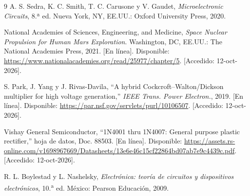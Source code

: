 \documentclass[conference,10pt]{IEEEtran}
\begin{document}
\begin{thebibliography}{9}
A. S. Sedra, K. C. Smith, T. C. Carusone y V. Gaudet, \emph{Microelectronic
Circuits}, 8.ª ed. Nueva York, NY, EE.UU.: Oxford University Press, 2020.

National Academies of Sciences, Engineering, and Medicine, \emph{Space
Nuclear Propulsion for Human Mars Exploration}. Washington, DC, EE.UU.:
The National Academies Press, 2021. [En línea]. Disponible:
\url{https://www.nationalacademies.org/read/25977/chapter/5}.
[Accedido: 12-oct-2026].

S. Park, J. Yang y J. Rivas-Davila, ``A hybrid Cockcroft--Walton/Dickson
multiplier for high voltage generation,'' \emph{IEEE Trans. Power
Electron.}, 2019. [En línea]. Disponible:
\url{https://par.nsf.gov/servlets/purl/10106507}.
[Accedido: 12-oct-2026].

Vishay General Semiconductor, ``1N4001 thru 1N4007: General purpose
plastic rectifier,'' hoja de datos, Doc. 88503. [En línea]. Disponible:
\url{https://assets.rs-online.com/v1698967669/Datasheets/13e6e46c15cf22864bd07ab7e9c4439c.pdf}.
[Accedido: 12-oct-2026].

R. L. Boylestad y L. Nashelsky, \emph{Electrónica: teoría de circuitos y
dispositivos electrónicos}, 10.\textsuperscript{a} ed. México: Pearson
Educación, 2009.

\end{thebibliography}
\end{document}
